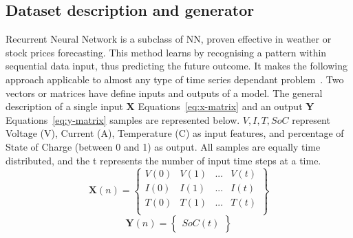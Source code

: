 \subsection{Dataset description and generator} \label{subsec:dataset}
Recurrent Neural Network is a subclass of NN, proven effective in weather or stock prices forecasting.
This method learns by recognising a pattern within sequential data input, thus predicting the future outcome.
It makes the following approach applicable to almost any type of time series dependant problem~\cite{anton_battery_2013}.
Two vectors or matrices have define inputs and outputs of a model.
The general description of a single input \textbf{X} \mbox{Equations~\ref{eq:x-matrix}} and an output \textbf{Y} \mbox{Equations~\ref{eq:y-matrix}} samples are represented below.
$V, I, T, SoC$ represent Voltage (V), Current (A), Temperature (\textdegree{}C) as input features, and percentage of State of Charge (between 0 and 1) as output.
All samples are equally time distributed, and the t represents the number of input time steps at a time.
\begin{equation}
    \textbf{X} \left (n  \right ) =
    \begin{Bmatrix}
        V \left (0  \right ) & V \left (1  \right ) & ... & V \left (t  \right )\\ 
        I \left (0  \right ) & I \left (1  \right ) & ... & I \left (t  \right )\\ 
        T \left (0  \right ) & T \left (1  \right ) & ... & T \left (t  \right )\\
    \end{Bmatrix}
    \label{eq:x-matrix}
\end{equation}
\begin{equation}
    \textbf{Y} \left (n  \right ) =
    \begin{Bmatrix}
        SoC \left (t  \right ) 
    \end{Bmatrix}
    \label{eq:y-matrix}
\end{equation}

